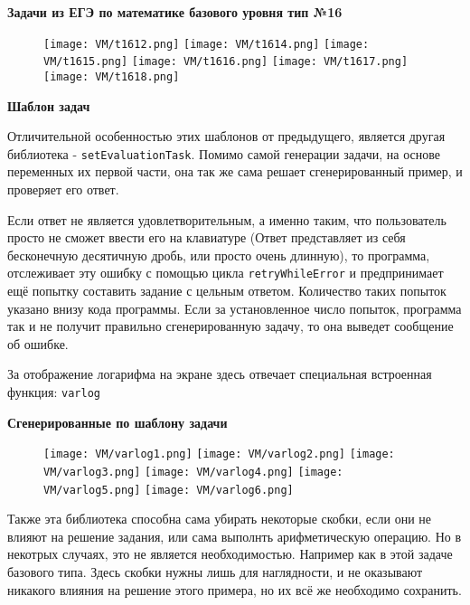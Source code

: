 \textbf{Задачи из ЕГЭ по математике базового уровня тип №16}

	\begin{figure}[h]
		\centering
		\texttt{[image: VM/t1612.png]}
		\texttt{[image: VM/t1614.png]}
		\texttt{[image: VM/t1615.png]}
		\texttt{[image: VM/t1616.png]}
		\texttt{[image: VM/t1617.png]}
		\texttt{[image: VM/t1618.png]}
\end{figure}
	
\textbf{Шаблон задач}


	
Отличительной особенностью этих шаблонов от предыдущего, является другая библиотека - \texttt{setEvaluationTask}. Помимо самой генерации задачи, на основе переменных их первой части, она так же сама решает сгенерированный пример, и проверяет его ответ. 

Если ответ не является удовлетворительным, а именно таким, что пользователь просто не сможет ввести его на клавиатуре (Ответ представляет из себя бесконечную десятичную дробь, или просто очень длинную), то программа, отслеживает эту ошибку с помощью цикла \texttt{retryWhileError} и предпринимает ещё попытку составить задание с цельным ответом. Количество таких попыток указано внизу кода программы. Если за установленное число попыток, программа так и не получит правильно сгенерированную задачу, то она выведет сообщение об ошибке.

За отображение логарифма на экране здесь отвечает специальная встроенная функция: \texttt{varlog}

\textbf{Сгенерированные по шаблону задачи}

\begin{figure}[h]
		\centering
		\texttt{[image: VM/varlog1.png]}
		\texttt{[image: VM/varlog2.png]}
		\texttt{[image: VM/varlog3.png]}
		\texttt{[image: VM/varlog4.png]}
		\texttt{[image: VM/varlog5.png]}
		\texttt{[image: VM/varlog6.png]}
\end{figure}

Также эта библиотека способна сама убирать некоторые скобки, если они не влияют на решение задания, или сама выполнть арифметическую операцию. Но в некотрых случаях, это не является необходимостью. Например как в этой задаче базового типа. Здесь скобки нужны лишь для наглядности, и не оказывают никакого влияния на решение этого примера, но их всё же необходимо сохранить.

